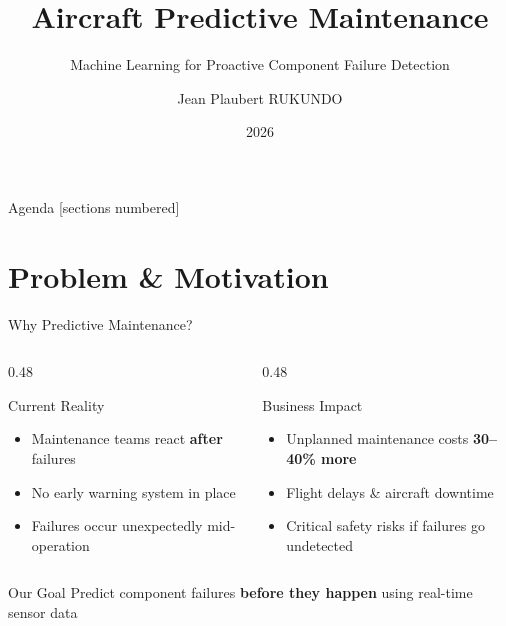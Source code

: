 \documentclass[aspectratio=169]{beamer}
\title{Aircraft Predictive Maintenance}
\subtitle{Machine Learning for Proactive Component Failure Detection}
\author{Jean Plaubert RUKUNDO}
\institute{Civil Aviation Project}
\date{2026}
\begin{document}

\begin{frame}
\titlepage
\end{frame}

\begin{frame}{Agenda}
  [sections numbered]
  \tableofcontents[hideallsubsections]
\end{frame}

\section{Problem \& Motivation}

\begin{frame}{Why Predictive Maintenance?}

  \begin{columns}[T]
    \begin{column}{0.48\textwidth}
      \begin{alertblock}{Current Reality}
        \begin{itemize}
          \item Maintenance teams react \textbf{after} failures
          \item No early warning system in place
          \item Failures occur unexpectedly mid-operation
        \end{itemize}
      \end{alertblock}
    \end{column}
    \begin{column}{0.48\textwidth}
      \begin{block}{Business Impact}
        \begin{itemize}
          \item Unplanned maintenance costs \textbf{30--40\% more}
          \item Flight delays \& aircraft downtime
          \item Critical safety risks if failures go undetected
        \end{itemize}
      \end{block}
    \end{column}
  \end{columns}

  \vspace{0.6cm}

  \begin{exampleblock}{Our Goal}
    \centering
    Predict component failures \textbf{before they happen} using real-time sensor data
  \end{exampleblock}

\end{frame}
\end{document}
